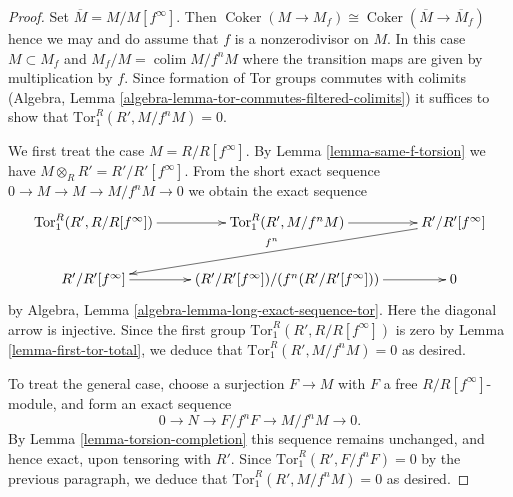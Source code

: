 \documentclass[10pt,a4paper]{amsart}
\theoremstyle{plain}
\theoremstyle{definition}
\theoremstyle{remark}
\numberwithin{equation}{subsection}
\def\colim{\mathop{\mathrm{colim}}\nolimits}
\def\Coker{\mathop{\mathrm{Coker}}}
\begin{document}
\begin{proof}
Set $\overline{M} = M/M[f^\infty]$. Then
$\Coker(M \to M_f) \cong \Coker(\overline{M} \to \overline{M}_f)$
hence we may and do assume that $f$ is a nonzerodivisor on $M$.
In this case $M \subset M_f$ and $M_f/M = \colim M/f^nM$ where the
transition maps are given by multiplication by $f$. Since
formation of Tor groups commutes with colimits
(Algebra, Lemma \ref{algebra-lemma-tor-commutes-filtered-colimits})
it suffices to show that $\text{Tor}^R_1(R', M/f^n M) = 0$.

\medskip\noindent
We first treat the case $M = R/R[f^\infty]$. By
Lemma \ref{lemma-same-f-torsion}
we have $M \otimes_R R' = R'/R'[f^\infty]$.
From the short exact sequence $0 \to M \to M \to M/f^nM \to 0$
we obtain the exact sequence
$$
\xymatrix{
\text{Tor}_1^R(R', R/R[f^\infty]) \ar[r] &
\text{Tor}_1^R(R', M/f^n M) \ar[r] &
R'/R'[f^\infty] \ar[dll]_{f^n} \\
R'/R'[f^\infty] \ar[r] &
(R'/R'[f^\infty])/(f^n
(R'/R'[f^\infty])) \ar[r] & 0
}
$$
by Algebra, Lemma \ref{algebra-lemma-long-exact-sequence-tor}.
Here the diagonal arrow is injective. Since the first group
$\text{Tor}_1^R(R', R/R[f^\infty])$ is zero by
Lemma \ref{lemma-first-tor-total}, we deduce that
$\text{Tor}_1^R(R', M/f^nM) = 0$ as desired.

\medskip\noindent
To treat the general case, choose a surjection $F \to M$ with $F$ a free
$R/R[f^\infty]$-module, and form an exact sequence
$$
0 \to N \to F/f^n F \to M/f^n M \to 0.
$$
By Lemma \ref{lemma-torsion-completion}
this sequence remains unchanged, and hence
exact, upon tensoring with $R'$.
Since $\text{Tor}^R_1(R', F/f^n F) = 0$ by the
previous paragraph, we deduce  that
$\text{Tor}^R_1(R', M/f^n M) = 0$ as desired.
\end{proof}
\end{document}
